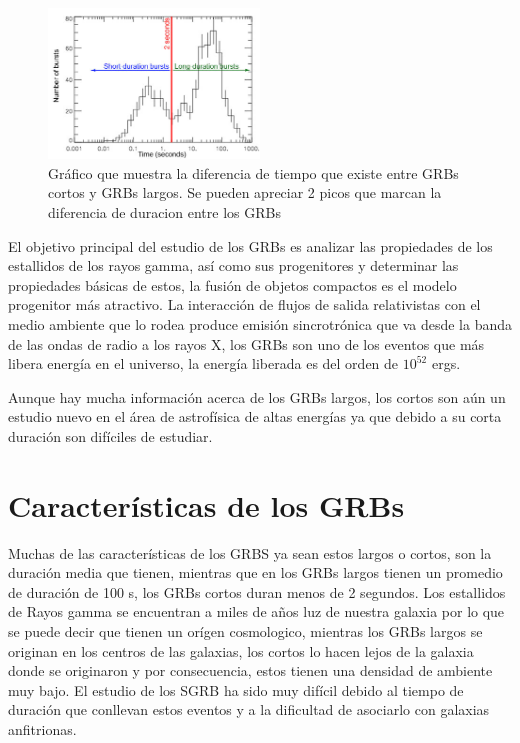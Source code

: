 \documentclass[12pt,a4paper]{book}
\begin{document}
\begin{figure} 
  \centering
    \includegraphics[width=0.5\textwidth]{Figuras/burst_durations_labelled.jpg}
  \caption{Gráfico que muestra la diferencia de tiempo que existe entre GRBs cortos y GRBs largos. Se pueden apreciar 2 picos que marcan la diferencia de duracion entre los GRBs}
  \label{fig:Batse_duration_GRBs}
\end{figure}

El objetivo principal del estudio de los GRBs es analizar las propiedades de los estallidos de los rayos gamma, así como sus progenitores y determinar las propiedades básicas de estos, la fusión de objetos compactos es el modelo progenitor más atractivo. La interacción de flujos de salida relativistas con el medio ambiente que lo rodea produce emisión sincrotrónica que va desde la banda de las ondas de radio a los rayos X, los GRBs son uno de los eventos que más libera energía en el universo, la energía liberada es del orden de $10^{52}$ ergs.

Aunque hay mucha información acerca de los GRBs largos, los cortos son aún un estudio nuevo en el área de astrofísica de altas energías ya que debido a su corta duración son difíciles de estudiar. 
\section{Características de los GRBs}
Muchas de las características de los GRBS ya sean estos largos o cortos, son la duración media que tienen, mientras que en los GRBs largos tienen un promedio de duración de 100 s, los GRBs cortos duran menos de 2 segundos. Los estallidos de Rayos gamma se encuentran a miles de años luz de nuestra galaxia por lo que se puede decir que tienen un orígen cosmologico, mientras los GRBs largos se originan en los centros de las galaxias, los cortos lo hacen lejos de la galaxia donde se originaron y por consecuencia, estos tienen una densidad de ambiente muy bajo. El estudio de los SGRB ha sido muy difícil debido al tiempo de duración que conllevan estos eventos y a la dificultad de asociarlo con galaxias anfitrionas. 
\end{document}
